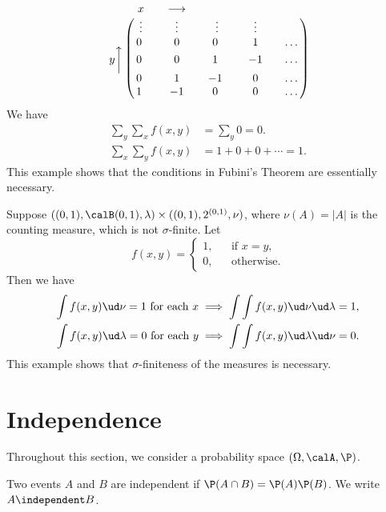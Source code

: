 \documentclass[../aipt.tex]{subfiles}
\begin{document}
\begin{Example}
\begin{equation}
\bordermatrix{
& x &&  \longrightarrow \cr
&\vdots && \vdots && \vdots&& \vdots \cr\\
&0\ && 0 && 0 \ && 1 && \ldots \cr\\
y \bigg\uparrow &0\ && 0 && 1 \ && -1 && \ldots \cr\\
&0\ && 1 && -1 \ && 0 && \ldots \cr\\
&1\ && -1 && 0 \ && 0 && \ldots \cr
}
\end{equation}
We have
\begin{align*}
\sum_y \sum_x f(x,y) &= \sum_y 0 = 0.\\
\sum_x \sum_y f(x,y) &= 1+0+0+\cdots = 1.
\end{align*}
This example shows that the conditions in Fubini's Theorem are essentially necessary. 
\end{Example}


\begin{Example}
Suppose $((0,1),\calB (0,1),\lambda) \times ((0,1),2^{(0,1)},\nu)$, where $\nu(A)=|A|$ is the counting measure, which is not $\sigma$-finite. Let
\begin{equation}
f(x,y)=\left\{
\begin{aligned}
1, && \text{if } x=y,\\
0, && \text{otherwise.} 
\end{aligned}
\right.
\end{equation}
Then we have
\begin{align*}
\int f(x,y) \ud \nu = 1 \text{ for each } x \implies \int \int f(x,y) \ud \nu \ud \lambda= 1,\\
\int f(x,y) \ud \lambda = 0 \text{ for each } y \implies \int \int f(x,y) \ud \lambda \ud \nu= 0.
\end{align*}
This example shows that $\sigma$-finiteness of the measures is necessary. 
\end{Example}




\section{Independence}

Throughout this section, we consider a probability space $(\Omega,\calA,\P)$.

\begin{Definition}
Two events $A$ and $B$ are independent if $\P(A \cap B) = \P(A)\P(B)$. We write $A \independent B$.
\end{Definition}
\end{document}
